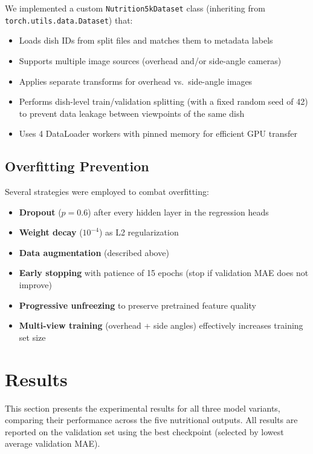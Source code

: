 \documentclass[11pt,a4paper]{article}
\begin{document}
We implemented a custom \texttt{Nutrition5kDataset} class (inheriting from \texttt{torch.utils.data.Dataset}) that:
\begin{itemize}
  \item Loads dish IDs from split files and matches them to metadata labels
  \item Supports multiple image sources (overhead and/or side-angle cameras)
  \item Applies separate transforms for overhead vs.\ side-angle images
  \item Performs dish-level train/validation splitting (with a fixed random seed of 42) to prevent data leakage between viewpoints of the same dish
  \item Uses 4 DataLoader workers with pinned memory for efficient GPU transfer
\end{itemize}

\subsection{Overfitting Prevention}

Several strategies were employed to combat overfitting:
\begin{itemize}
  \item \textbf{Dropout} ($p = 0.6$) after every hidden layer in the regression heads
  \item \textbf{Weight decay} ($10^{-4}$) as L2 regularization
  \item \textbf{Data augmentation} (described above)
  \item \textbf{Early stopping} with patience of 15 epochs (stop if validation MAE does not improve)
  \item \textbf{Progressive unfreezing} to preserve pretrained feature quality
  \item \textbf{Multi-view training} (overhead + side angles) effectively increases training set size
\end{itemize}

\section{Results}
\label{sec:results}

This section presents the experimental results for all three model variants, comparing their performance across the five nutritional outputs. All results are reported on the validation set using the best checkpoint (selected by lowest average validation MAE).
\end{document}
